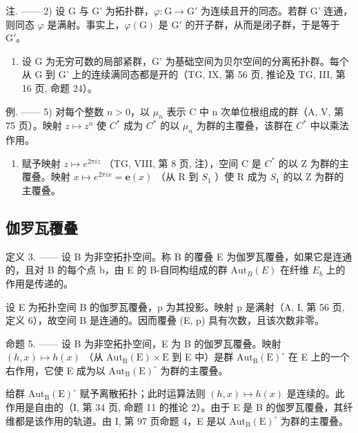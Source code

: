 注. —— 2) 设 G 与 G' 为拓扑群，\(\varphi\colon\mathrm{G}\to\mathrm{G}'\) 为连续且开的同态。若群 G' 连通，则同态 \(\varphi\) 是满射。事实上，\(\varphi(\mathrm{G})\) 是 \(\mathrm{G}'\) 的开子群，从而是闭子群，于是等于 \(\mathrm{G}'\)。

\begin{enumerate}
\def\labelenumi{\arabic{enumi})}
\setcounter{enumi}{2}
\tightlist
\item
  设 G 为无穷可数的局部紧群，G' 为基础空间为贝尔空间的分离拓扑群。每个从 G 到 G' 上的连续满同态都是开的（TG, IX, 第 56 页, 推论及 TG, III, 第 16 页, 命题 24）。
\end{enumerate}

例. —— 5) 对每个整数 \(n > 0\)，以 \(\mu_{n}\) 表示 C 中 n 次单位根组成的群（A, V, 第 75 页）。映射 \(z \mapsto z^{n}\) 使 \(C^{*}\) 成为 \(C^{*}\) 的以 \(\mu_{n}\) 为群的主覆叠，该群在 \(C^{*}\) 中以乘法作用。

\begin{enumerate}
\def\labelenumi{\arabic{enumi})}
\setcounter{enumi}{5}
\tightlist
\item
  赋予映射 \(z \mapsto e^{2\pi iz}\) （TG, VIII, 第 8 页, 注），空间 C 是 \(C^{*}\) 的以 Z 为群的主覆叠。映射 \(x \mapsto e^{2\pi ix} = \mathbf{e}(x)\) （从 R 到 \(S_{1}\) ）使 R 成为 \(S_{1}\) 的以 Z 为群的主覆叠。
\end{enumerate}

\subsection{伽罗瓦覆叠}

定义 3. —— 设 B 为非空拓扑空间。称 B 的覆叠 E 为伽罗瓦覆叠，如果它是连通的，且对 B 的每个点 b，由 E 的 B-自同构组成的群 \(\mathrm{Aut}_{B}(E)\) 在纤维 \(E_{b}\) 上的作用是传递的。

设 E 为拓扑空间 B 的伽罗瓦覆叠，p 为其投影。映射 p 是满射（A, I, 第 56 页, 定义 6），故空间 B 是连通的。因而覆叠 (E, p) 具有次数，且该次数非零。

命题 5. —— 设 B 为非空拓扑空间，E 为 B 的伽罗瓦覆叠。映射 \((h,x)\mapsto h(x)\) （从 \(\mathrm{Aut}_{\mathrm{B}}(\mathrm{E})\times\mathrm{E}\) 到 E 中）是群 \(\mathrm{Aut}_{\mathrm{B}}(\mathrm{E})^{\circ}\) 在 E 上的一个右作用，它使 E 成为以 \(\mathrm{Aut}_{\mathrm{B}}(\mathrm{E})^{\circ}\) 为群的主覆叠。

给群 \(\mathrm{Aut}_{\mathrm{B}}(\mathrm{E})^{\circ}\) 赋予离散拓扑；此时运算法则 \((h,x)\mapsto h(x)\) 是连续的。此作用是自由的（I, 第 34 页, 命题 11 的推论 2）。由于 E 是 B 的伽罗瓦覆叠，其纤维都是该作用的轨道。由 I, 第 97 页命题 4，E 是以 \(\mathrm{Aut}_{\mathrm{B}}(\mathrm{E})^{\circ}\) 为群的主覆叠。

